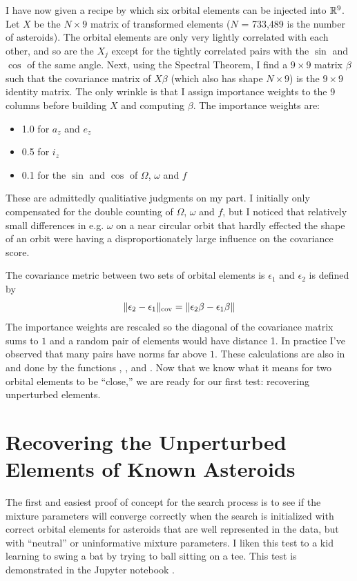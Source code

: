 I have now given a recipe by which six orbital elements can be injected into $\mathbb{R}^{9}$.
Let $X$ be the $N \times 9$ matrix of transformed elements ($N$ = 733,489 is the number of asteroids).
The orbital elements are only very lightly correlated with each other, 
and so are the $X_j$ except for the tightly correlated pairs with the $\sin$ and $\cos$ of the same angle.
Next, using the Spectral Theorem, I find a $9 \times 9$ matrix $\beta$ such that the covariance matrix of $X \beta$  
(which also has shape $N \times 9$) is the $9 \times 9$ identity matrix.
The only wrinkle is that I assign importance weights to the 9 columns before building $X$ and computing $\beta$.
The importance weights are:
\begin{itemize}
\item 1.0 for $a_z$ and $e_z$
\item 0.5 for $i_z$
\item 0.1 for the $\sin$ and $\cos$ of $\Omega$, $\omega$ and $f$
\end{itemize}
These are admittedly qualitiative judgments on my part. 
I initially only compensated for the double counting of $\Omega$, $\omega$ and $f$, 
but I noticed that relatively small differences in e.g. $\omega$ on a near circular orbit that hardly effected the shape of an orbit
were having a disproportionately large influence on the covariance score.

The covariance metric between two sets of orbital elements is $\epsilon_1$ and $\epsilon_2$ is defined by
$$ \lVert\epsilon_2 - \epsilon_1\rVert_{\mathrm{cov}} = \lVert\epsilon_2 \beta - \epsilon_1 \beta\rVert $$
The importance weights are rescaled so the diagonal of the covariance matrix sums to $1$ and a random pair of elements would have distance 1.
In practice I've observed that many pairs have norms far above $1$.
These calculations are also in  and done by the 
functions , ,  and .
Now that we know what it means for two orbital elements to be ``close,'' 
we are ready for our first test: recovering unperturbed elements.

\section{Recovering the Unperturbed Elements of Known Asteroids}
\label{section_results_known_ast_unperturbed}

The first and easiest proof of concept for the search process is to see if the mixture parameters will converge correctly
when the search is initialized with correct orbital elements for asteroids that are well represented in the data,
but with ``neutral'' or uninformative mixture parameters.
I liken this test to a kid learning to swing a bat by trying to ball sitting on a tee.
This test is demonstrated in the Jupyter notebook .


